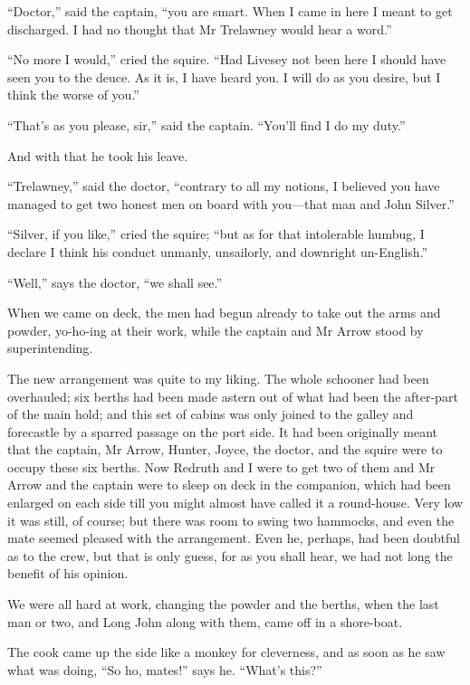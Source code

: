 \enquote{Doctor,} said the captain, \enquote{you are smart. When I came in here I meant to get discharged. I had no thought that Mr Trelawney would hear a word.}

\enquote{No more I would,} cried the squire. \enquote{Had Livesey not been here I should have seen you to the deuce. As it is, I have heard you. I will do as you desire, but I think the worse of you.}

\enquote{That’s as you please, sir,} said the captain. \enquote{You’ll find I do my duty.}

And with that he took his leave.

\enquote{Trelawney,} said the doctor, \enquote{contrary to all my notions, I believed you have managed to get two honest men on board with you---that man and John Silver.}

\enquote{Silver, if you like,} cried the squire; \enquote{but as for that intolerable humbug, I declare I think his conduct unmanly, unsailorly, and downright un-English.}

\enquote{Well,} says the doctor, \enquote{we shall see.}

When we came on deck, the men had begun already to take out the arms and powder, yo-ho-ing at their work, while the captain and Mr Arrow stood by superintending.

The new arrangement was quite to my liking. The whole schooner had been overhauled; six berths had been made astern out of what had been the after-part of the main hold; and this set of cabins was only joined to the galley and forecastle by a sparred passage on the port side. It had been originally meant that the captain, Mr Arrow, Hunter, Joyce, the doctor, and the squire were to occupy these six berths. Now Redruth and I were to get two of them and Mr Arrow and the captain were to sleep on deck in the companion, which had been enlarged on each side till you might almost have called it a round-house. Very low it was still, of course; but there was room to swing two hammocks, and even the mate seemed pleased with the arrangement. Even he, perhaps, had been doubtful as to the crew, but that is only guess, for as you shall hear, we had not long the benefit of his opinion.

We were all hard at work, changing the powder and the berths, when the last man or two, and Long John along with them, came off in a shore-boat.

The cook came up the side like a monkey for cleverness, and as soon as he saw what was doing, \enquote{So ho, mates!} says he. \enquote{What’s this?}

